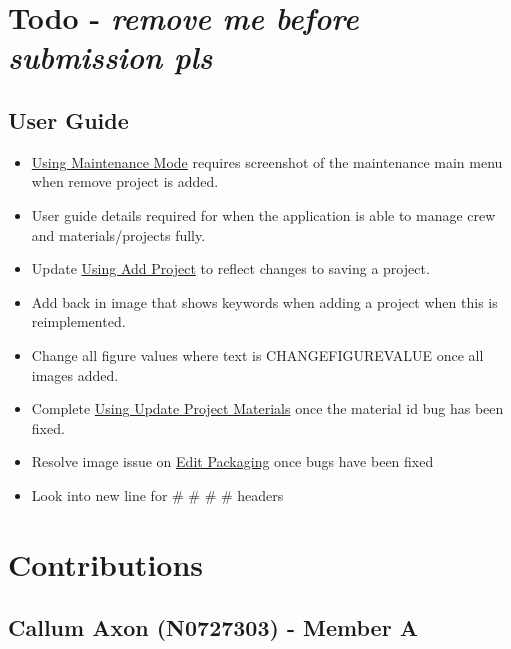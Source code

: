 \documentclass[
  english,
  a4paper,
,tablecaptionabove
]{scrartcl}
\providecommand{\tightlist}{%
  \setlength{\itemsep}{0pt}\setlength{\parskip}{0pt}}
\begin{document}
\newpage

\hypertarget{todo---remove-me-before-submission-pls}{%
\section{\texorpdfstring{Todo - \textbf{\emph{remove me before
submission
pls}}}{Todo - remove me before submission pls}}\label{todo---remove-me-before-submission-pls}}

\hypertarget{user-guide}{%
\subsection{User Guide}\label{user-guide}}

\begin{itemize}
\tightlist
\item
  \protect\hyperlink{using-maintenance-mode}{Using Maintenance Mode}
  requires screenshot of the maintenance main menu when remove project
  is added.
\item
  User guide details required for when the application is able to manage
  crew and materials/projects fully.
\item
  Update \protect\hyperlink{using-add-project}{Using Add Project} to
  reflect changes to saving a project.
\item
  Add back in image that shows keywords when adding a project when this
  is reimplemented.
\item
  Change all figure values where text is CHANGEFIGUREVALUE once all
  images added.
\item
  Complete \protect\hyperlink{using-update-project-materials}{Using
  Update Project Materials} once the material id bug has been fixed.
\item
  Resolve image issue on \protect\hyperlink{edit-packaging}{Edit
  Packaging} once bugs have been fixed
\item
  Look into new line for \# \# \# \# headers
\end{itemize}

\newpage

\hypertarget{contributions}{%
\section{Contributions}\label{contributions}}

\hypertarget{callum-axon-n0727303---member-a}{%
\subsection{Callum Axon (N0727303) - Member
A}\label{callum-axon-n0727303---member-a}}
\end{document}
